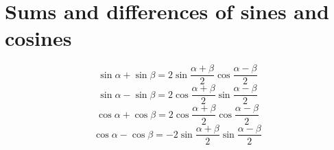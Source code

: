 \documentclass[a4paper, 10pt]{scrartcl}
\begin{document}
\section{Sums and differences of sines and cosines}
\[\sin{\alpha} + \sin{\beta} = 2\sin{\frac{\alpha + \beta}{2}}\cos{\frac{\alpha - \beta}{2}}\]
\[\sin{\alpha} - \sin{\beta} = 2\cos{\frac{\alpha + \beta}{2}}\sin{\frac{\alpha - \beta}{2}}\]
\[\cos{\alpha} + \cos{\beta} = 2\cos{\frac{\alpha + \beta}{2}}\cos{\frac{\alpha - \beta}{2}}\]
\[\cos{\alpha} - \cos{\beta} = -2\sin{\frac{\alpha + \beta}{2}}\sin{\frac{\alpha - \beta}{2}}\]
\end{document}
